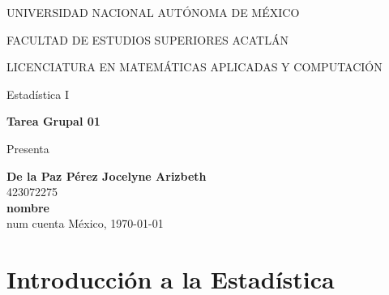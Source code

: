 \documentclass[11pt,a4paper]{report}
\begin{document}
\begin{titlepage}
    \begin{center}
       \vspace{0.5cm}
        \Large
        UNIVERSIDAD NACIONAL AUTÓNOMA DE MÉXICO
        
        \vspace{0.3cm}
        \Large
        FACULTAD DE ESTUDIOS SUPERIORES ACATLÁN
       
        \vspace{0.3cm}
        \large
        LICENCIATURA EN MATEMÁTICAS APLICADAS Y COMPUTACIÓN
       
        \vspace{1.6cm}
        \normalsize
        Estadística I
        
        \vspace{1.4cm}
        \LARGE 
        \textbf{Tarea Grupal 01}
        
        \vspace{1cm}
        \normalsize
        Presenta
        
        
        \vspace{0.8cm}
        \large
        \textbf{De la Paz Pérez Jocelyne Arizbeth} \\
        423072275 \\
        \vspace{0.5cm}
        \textbf{nombre} \\
        num cuenta
        \vfill
        México,  \today
        
        \vspace{4cm}
        
    \end{center}
\end{titlepage}

\tableofcontents

\chapter{Introducción a la Estadística}
\end{document}
